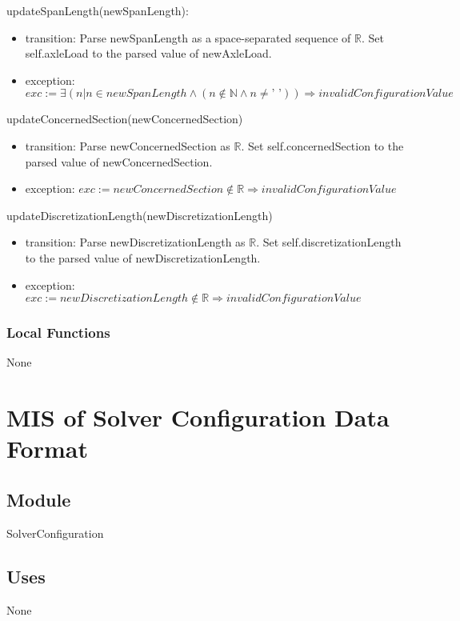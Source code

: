 \documentclass[12pt, titlepage]{article}
\begin{document}
\noindent updateSpanLength(newSpanLength):
\begin{itemize}
\item transition: Parse newSpanLength as a space-separated sequence of $\mathbb{R}$. Set self.axleLoad to the parsed value of newAxleLoad.
\item exception: $exc := \exists(n | n \in newSpanLength \land (n \notin \mathbb{N} \land n \neq \text{' '})) \Rightarrow invalidConfigurationValue$
\end{itemize}

\noindent updateConcernedSection(newConcernedSection)
\begin{itemize}
\item transition: Parse newConcernedSection as $\mathbb{R}$. Set self.concernedSection to the parsed value of newConcernedSection.
\item exception: $exc := newConcernedSection \notin \mathbb{R} \Rightarrow invalidConfigurationValue$
\end{itemize}

\noindent updateDiscretizationLength(newDiscretizationLength)
\begin{itemize}
\item transition: Parse newDiscretizationLength as $\mathbb{R}$. Set self.discretizationLength to the parsed value of newDiscretizationLength.
\item exception: $exc := newDiscretizationLength \notin \mathbb{R} \Rightarrow invalidConfigurationValue$
\end{itemize}

\subsubsection{Local Functions}
None
\newpage

\section{MIS of Solver Configuration Data Format} \label{SolverConfiguration} 

\subsection{Module}

SolverConfiguration

\subsection{Uses}
None
\end{document}
